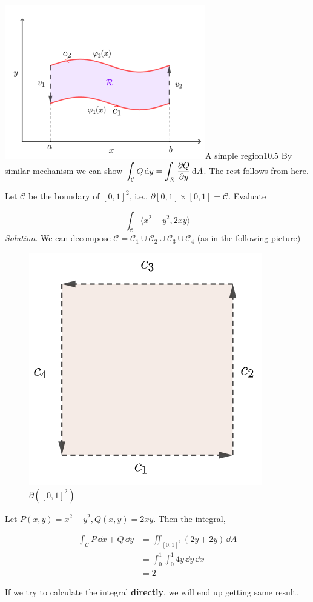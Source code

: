 \documentclass[../Analysis-3.tex]{subfiles}
\begin{document}
\begin{proofFig}{\includegraphics[width=.78\linewidth]{../figures/lec-28.1.png}}{A simple region}{\label{R2:green:thm}}{10}{.5\textwidth}
  By similar mechanism we can show $\displaystyle\int_{\mathcal{C}} Q \, \dd y = \int_{\mathcal{R}} \pdv{Q}{y} \, \dd A$. The rest follows from here.
\end{proofFig}

\begin{Eg}{}{}
  Let $\mathcal{C}$ be the boundary of $[0,1]^2$, i.e., $\partial [0,1]\times[0,1] = \mathcal{C}$. Evaluate

  \[\int_{\mathcal{C}} \langle x^2-y^2,2xy \rangle\]
  \textit{Solution.} We can decompose $\mathcal{C} = \mathcal{C}_1 \cup \mathcal{C}_2 \cup \mathcal{C}_3 \cup \mathcal{C}_4$ (as in the following picture)

  \begin{figure}
    \centering
    \includegraphics[width=.78\linewidth]{../figures/lec-28.2.png}
    \caption{$\partial( [0,1]^2)$}
  \end{figure}

  Let $P(x,y) = x^2 - y^2, Q(x,y) = 2xy$. Then the integral,

  \begin{align*}
    \int_{\mathcal{C}} P \, \dd x + Q \, \dd y
     & = \iint_{[0,1]^2} (2y + 2y) \, \dd A   \tag{Green's Theorem} \\
     & = \int_{0}^1 \int_0^1 4y \, \dd y \, \dd x                   \\
     & = 2
  \end{align*}

  If we try to calculate the integral \textbf{directly}, we will end up getting same result.
\end{Eg}
\end{document}
